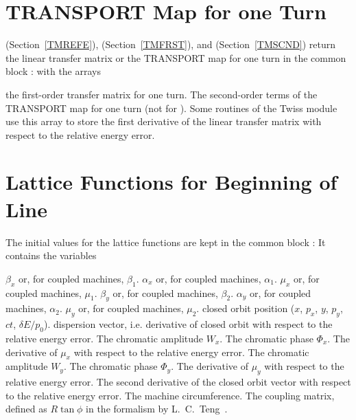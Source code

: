 \section{TRANSPORT Map for one Turn}
\label{Smapt}
 (Section~\ref{TMREFE}), 
 (Section~\ref{TMFRST}),
and  (Section~\ref{TMSCND})
return the linear transfer matrix or the TRANSPORT map for one turn
in the common block :
with the arrays
\begin{mylist}
the first-order transfer matrix for one turn.
The second-order terms of the TRANSPORT map for one turn
(not for ).
Some routines of the Twiss module use this array to store the first
derivative of the linear transfer matrix with respect
to the relative energy error.
\end{mylist}
 
\section{Lattice Functions for Beginning of Line}
\label{Sopt0}
The initial values for the lattice functions are kept in the common
block :
It contains the variables
\begin{mylist}
$\beta_x$ or, for coupled machines, $\beta_1$.
$\alpha_x$ or, for coupled machines, $\alpha_1$.
$\mu_x$ or, for coupled machines, $\mu_1$.
$\beta_y$ or, for coupled machines, $\beta_2$.
$\alpha_y$ or, for coupled machines, $\alpha_2$.
$\mu_y$ or, for coupled machines, $\mu_2$.
closed orbit position ($x$, $p_x$, $y$, $p_y$, $ct$, $\delta E/p_0$).
dispersion vector, i.e. derivative of closed orbit with respect to
the relative energy error.
The chromatic amplitude $W_x$.
The chromatic phase $\Phi_x$.
The derivative of $\mu_x$ with respect to the relative energy error.
The chromatic amplitude $W_y$.
The chromatic phase $\Phi_y$.
The derivative of $\mu_y$ with respect to the relative energy error.
The second derivative of the closed orbit vector with respect to
the relative energy error.
The machine circumference.
The coupling matrix,
defined as $R \tan \phi$ in the formalism by L.~C.~Teng~\cite{TENG}.
\end{mylist}
 

